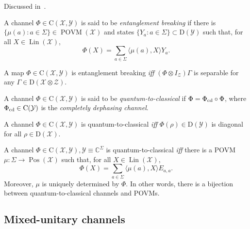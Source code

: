 \documentclass[12pt]{report}
\newcommand{\CC}{\mathbb{C}}
\newcommand{\on}[1]{\operatorname{#1}}
\newcommand{\calY}{{\mathcal{Y}}}
\newcommand{\calX}{{\mathcal{X}}}
\newcommand{\calZ}{{\mathcal{Z}}}
\newcommand{\rmC}{{\mathrm{C}}}
\newcommand{\rmD}{{\mathrm{D}}}
\DeclareMathOperator{\Pos}{Pos}
\DeclareMathOperator{\Lin}{Lin}
\begin{document}
Discussed in~\parencite{horodecki2003entanglement,watrous2018theory}.

\begin{defn}
	A channel $\Phi\in\rmC(\calX,\calY)$ is said to be \emph{entanglement breaking} if there is $\{\mu(a):a\in\Sigma\}\in\on{POVM}(\calX)$
	and states $\{Y_a:a\in\Sigma\}\subset\rmD(\calY)$ such that,
	for all $X\in\Lin(\calX)$,
	\begin{equation}
		\Phi(X) = \sum_{a\in\Sigma} \langle \mu(a),X\rangle Y_a.
	\end{equation}
\end{defn}

\begin{prop}
	A map $\Phi\in\rmC(\calX,\calY)$ is entanglement breaking \emph{iff} $(\Phi\otimes I_{\calZ})\Gamma$ is separable for any $\Gamma\in\rmD(\calX\otimes\calZ)$.
\end{prop}

\begin{defn}
	A channel $\Phi\in\rmC(\calX,\calY)$ is said to be \emph{quantum-to-classical} if $\Phi=\Phi_{\rm cd}\circ\Phi$,
	where $\Phi_{\rm cd}\in\rmC(\calY)$ is the \emph{completely dephasing channel}.
\end{defn}


\begin{prop}
	A channel $\Phi\in\rmC(\calX,\calY)$ is quantum-to-classical \emph{iff}
	$\Phi(\rho)\in\rmD(\calY)$ is diagonal for all $\rho\in\rmD(\calX)$.
\end{prop}

\begin{prop}
	A channel $\Phi\in\rmC(\calX,\calY), \calY\equiv \CC^\Sigma$ is quantum-to-classical \emph{iff}
	there is a POVM $\mu:\Sigma\to\Pos(\calX)$ such that, for all $X\in\Lin(\calX)$,
	\begin{equation}
		\Phi(X) = \sum_{a\in\Sigma} \langle\mu(a),X\rangle E_{a,a}.
	\end{equation}
	Moreover, $\mu$ is uniquely determined by $\Phi$.
	In other words, there is a bijection between quantum-to-classical channels and POVMs.
\end{prop}

\subsection{Mixed-unitary channels}
\end{document}
